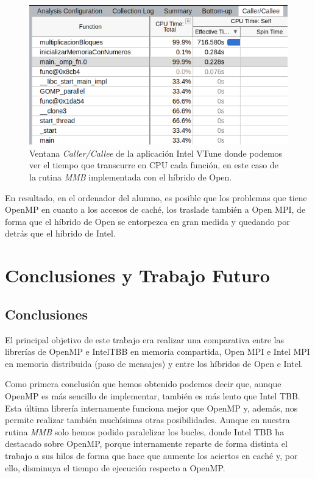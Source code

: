 \documentclass[a4paper,12pt]{article}
\begin{document}
\begin{figure}[htbp]
    \includegraphics[scale=0.7]{./images/vtunehibomp.png}
    \centering
    \caption{Ventana {\it Caller/Callee} de la aplicación Intel VTune donde podemos ver el tiempo que transcurre en CPU cada función, en este caso de la rutina {\it MMB} implementada con el híbrido de Open.}
    \label{fig:vtune-hibomp}
\end{figure}

En resultado, en el ordenador del alumno, es posible que los problemas que tiene OpenMP en cuanto a los accesos de caché, los traslade también a Open MPI, de forma que el híbrido de Open se entorpezca en gran medida y quedando por detrás que el híbrido de Intel.

\newpage
\section{Conclusiones y Trabajo Futuro} \label{sec:conclusiones}

\subsection{Conclusiones}
El principal objetivo de este trabajo era realizar una comparativa entre las librerías de OpenMP e IntelTBB en memoria compartida, Open MPI e Intel MPI en memoria distribuida (paso de mensajes) y entre los híbridos de Open e Intel.

Como primera conclusión que hemos obtenido podemos decir que, aunque OpenMP es más sencillo de implementar, también es más lento que Intel TBB. Esta última librería internamente funciona mejor que OpenMP y, además, nos permite realizar también muchísimas otras posibilidades. Aunque en nuestra rutina {\it MMB} solo hemos podido paralelizar los bucles, donde Intel TBB ha destacado sobre OpenMP, porque internamente reparte de forma distinta el trabajo a sus hilos de forma que hace que aumente los aciertos en caché y, por ello, disminuya el tiempo de ejecución respecto a OpenMP.
\end{document}

